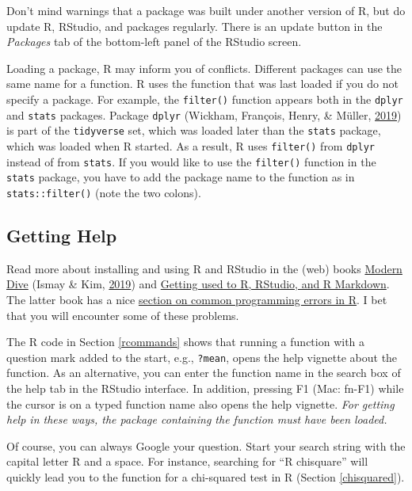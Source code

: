 \documentclass[doc,floatsintext]{apa6}
\begin{document}
Don't mind warnings that a package was built under another version of R,
but do update R, RStudio, and packages regularly. There is an update
button in the \emph{Packages} tab of the bottom-left panel of the
RStudio screen.

Loading a package, R may inform you of conflicts. Different packages can
use the same name for a function. R uses the function that was last
loaded if you do not specify a package. For example, the
\texttt{filter()} function appears both in the \texttt{dplyr} and
\texttt{stats} packages. Package \texttt{dplyr} (Wickham, François,
Henry, \& Müller, \protect\hyperlink{ref-R-dplyr}{2019}) is part of the
\texttt{tidyverse} set, which was loaded later than the \texttt{stats}
package, which was loaded when R started. As a result, R uses
\texttt{filter()} from \texttt{dplyr} instead of from \texttt{stats}. If
you would like to use the \texttt{filter()} function in the
\texttt{stats} package, you have to add the package name to the function
as in \texttt{stats::filter()} (note the two colons).

\subsection{Getting Help}\label{getting-help}

Read more about installing and using R and RStudio in the (web) books
\href{https://moderndive.com/1-getting-started.html}{Modern Dive} (Ismay
\& Kim, \protect\hyperlink{ref-IsmayIntroductionStatisticalData}{2019})
and
\href{https://ismayc.github.io/rbasics-book/3-rstudiobasics.html}{Getting
used to R, RStudio, and R Markdown}. The latter book has a nice
\href{https://ismayc.github.io/rbasics-book/6-errors.html}{section on
common programming errors in R}. I bet that you will encounter some of
these problems.

The R code in Section \ref{rcommands} shows that running a function with
a question mark added to the start, e.g., \texttt{?mean}, opens the help
vignette about the function. As an alternative, you can enter the
function name in the search box of the help tab in the RStudio
interface. In addition, pressing F1 (Mac: fn-F1) while the cursor is on
a typed function name also opens the help vignette. \emph{For getting
help in these ways, the package containing the function must have been
loaded.}

Of course, you can always Google your question. Start your search string
with the capital letter R and a space. For instance, searching for
\enquote{R chisquare} will quickly lead you to the function for a
chi-squared test in R (Section \ref{chisquared}).
\end{document}
